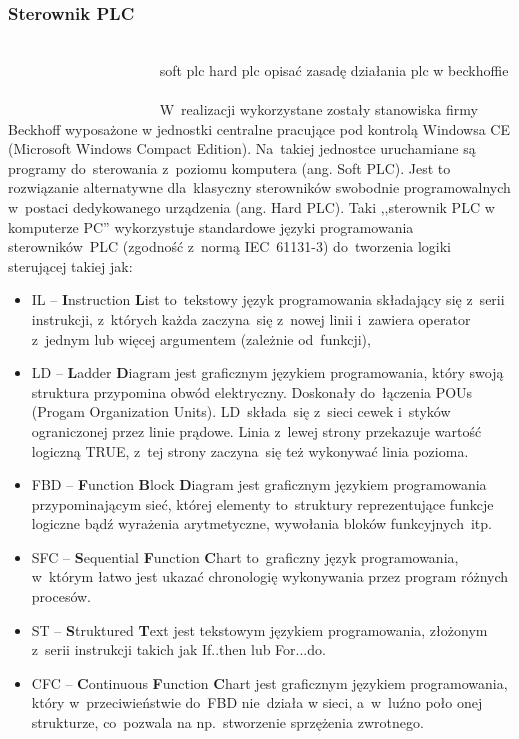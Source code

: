 \subsubsection{Sterownik PLC}
~~~~~~~~~~~~~~~~~~~~~~~~~~~~~~~~~~~~~~~~~~~~~~~~~~~~~~~~~~~~~~~~~~~~~~~~~~~~~~~~~~~~~~~~~~~~~
soft plc
hard plc
opisać zasadę działania plc w beckhoffie
~~~~~~~~~~~~~~~~~~~~~~~~~~~~~~~~~~~~~~~~~~~~~~~~~~~~~~~~~~~~~~~~~~~~~~~~~~~~~~~~~~~~~~~~~~~~~
W~realizacji wykorzystane zostały stanowiska firmy Beckhoff wyposażone w jednostki centralne pracujące pod kontrolą Windowsa CE (Microsoft Windows Compact Edition). Na~takiej jednostce uruchamiane są programy do~sterowania z~poziomu komputera (ang. Soft PLC). Jest to rozwiązanie alternatywne dla~klasyczny sterowników swobodnie programowalnych w~postaci dedykowanego urządzenia (ang. Hard PLC).
Taki ,,sterownik PLC w komputerze PC'' wykorzystuje standardowe języki programowania sterowników~PLC (zgodność z~normą IEC~61131-3) do~tworzenia logiki sterującej takiej jak:
\begin{itemize}
\item IL -- \textbf{I}nstruction \textbf{L}ist to~tekstowy język programowania składający się z~serii instrukcji, z~których każda zaczyna~się z~nowej linii i~zawiera operator z~jednym lub więcej argumentem (zależnie od~funkcji),

\item LD -- \textbf{L}adder \textbf{D}iagram jest graficznym językiem programowania, który swoją struktura przypomina obwód elektryczny. Doskonały do~łączenia POUs (Progam Organization Units). LD~składa~się z~sieci cewek i~styków ograniczonej przez linie prądowe. Linia z~lewej strony przekazuje wartość logiczną TRUE, z~tej strony zaczyna~się też wykonywać linia pozioma.

\item FBD -- \textbf{F}unction \textbf{B}lock \textbf{D}iagram jest graficznym językiem programowania przypominającym sieć, której elementy to~struktury reprezentujące funkcje logiczne bądź wyrażenia arytmetyczne, wywołania bloków funkcyjnych~itp.

\item SFC -- \textbf{S}equential \textbf{F}unction \textbf{C}hart to~graficzny język programowania, w~którym łatwo jest ukazać chronologię wykonywania przez program różnych procesów.

\item ST -- \textbf{S}truktured \textbf{T}ext jest tekstowym językiem programowania, złożonym z~serii instrukcji takich jak If..then lub For...do.

\item CFC -- \textbf{C}ontinuous \textbf{F}unction \textbf{C}hart jest graficznym językiem programowania, który w~przeciwieństwie do~FBD nie~działa w sieci, a~w~luźno poło onej strukturze, co~pozwala na np.~stworzenie sprzężenia zwrotnego.
\end{itemize}

